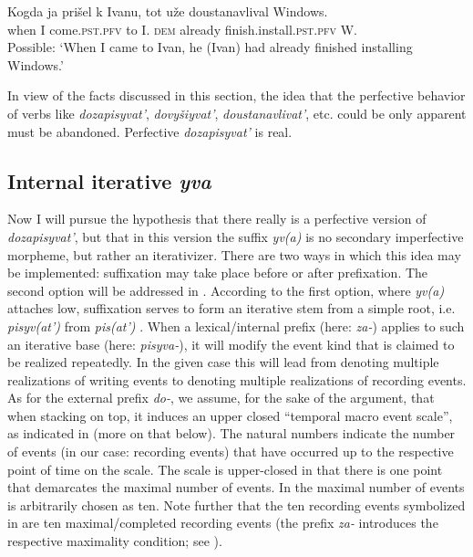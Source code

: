 \documentclass[output=paper,
colorlinks,
citecolor=brown,
newtxmath
]{langscibook}
\begin{document}
\ea\label{noplusqu2}
\gll Kogda ja prišel k Ivanu, tot uže doustanavlival Windows.\\
when I come.\textsc{pst.pfv} to I. \textsc{dem} already {finish.install.}\textsc{pst.pfv} W.\\
\glt Possible: `When I came to Ivan, he (Ivan) had already finished installing Windows.'
\z

\noindent In view of the facts discussed in this section, the idea that the perfective behavior of verbs like \textit{dozapisyvat'}, \textit{dovyšiyvat'},  \textit{doustanavlivat'}, etc. could be only apparent must be abandoned. Perfective \textit{dozapisyvat'} is real.


\subsection{Internal iterative \textit{yva}}\label{H3}

Now I will pursue the hypothesis that there really is a perfective version of \textit{dozapisyvat'}, but that in this version the suffix \textit{yv(a)} is no secondary imperfective morpheme, but rather an iterativizer. There are two ways in which this idea may be implemented: suffixation may take place before or after prefixation. The second option will be addressed in . According to the first option, where \textit{yv(a)} attaches low, suffixation serves to form an iterative stem from a simple root, i.e. \textit{pisyv(at')} from \textit{pis(at')} \citep[see][]{Paduceva2015}. When a lexical/internal prefix (here: \textit{za-}) applies to such an iterative base (here: \textit{pisyva-}), it will modify the event kind that is claimed to be realized repeatedly. In the given case this will lead from denoting multiple realizations of writing events to denoting multiple realizations of recording events. As for the external prefix \textit{do-}, we assume, for the sake of the argument, that when stacking on top, it induces an upper closed ``temporal macro event scale'', as indicated in  (more on that below). The natural numbers indicate the number of events (in our case: recording events) that have occurred up to the respective point of time on the scale. The scale is upper-closed in that there is one point that demarcates the maximal number of events. In  the maximal number of events is arbitrarily chosen as ten. Note further that the ten recording events symbolized in  are ten maximal/completed recording events (the prefix \textit{za-} introduces the respective maximality condition; see ).
\end{document}
